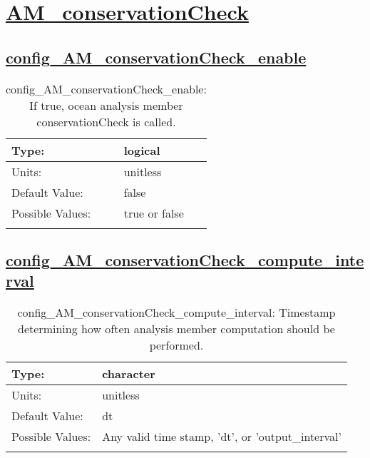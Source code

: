 \section[AM\_conservationCheck]{\hyperref[sec:nm_tab_AM_conservationCheck]{AM\_conservationCheck}}
\label{sec:nm_sec_AM_conservationCheck}
\subsection[config\_AM\_conservationCheck\_enable]{\hyperref[sec:nm_tab_AM_conservationCheck]{config\_AM\_conservationCheck\_enable}}
\label{subsec:nm_sec_config_AM_conservationCheck_enable}
\begin{center}
\begin{longtable}{| p{2.0in} || p{4.0in} |}
    \hline
    Type: & logical \\
    \hline
    Units: & \si{unitless} \\
    \hline
    Default Value: & false \\
    \hline
    Possible Values: & true or false \\
    \hline
    \caption{config\_AM\_conservationCheck\_enable: If true, ocean analysis member conservationCheck is called.}
\end{longtable}
\end{center}
\subsection[config\_AM\_conservationCheck\_compute\_interval]{\hyperref[sec:nm_tab_AM_conservationCheck]{config\_AM\_conservationCheck\_compute\_interval}}
\label{subsec:nm_sec_config_AM_conservationCheck_compute_interval}
\begin{center}
\begin{longtable}{| p{2.0in} || p{4.0in} |}
    \hline
    Type: & character \\
    \hline
    Units: & \si{unitless} \\
    \hline
    Default Value: & dt \\
    \hline
    Possible Values: & Any valid time stamp, 'dt', or 'output\_interval' \\
    \hline
    \caption{config\_AM\_conservationCheck\_compute\_interval: Timestamp determining how often analysis member computation should be performed.}
\end{longtable}
\end{center}
